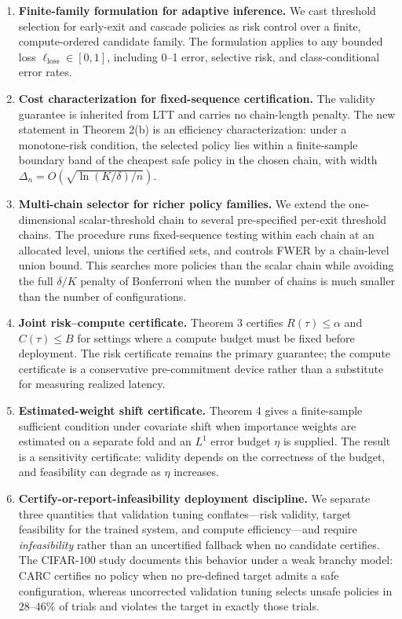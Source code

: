 \documentclass{ieeeaccess}
\begin{document}
\begin{enumerate}
\item \textbf{Finite-family formulation for adaptive inference.} We cast threshold selection for early-exit and cascade policies as risk control over a finite, compute-ordered candidate family. The formulation applies to any bounded loss $\ell_{\mathrm{loss}}\in[0,1]$, including 0--1 error, selective risk, and class-conditional error rates.
\item \textbf{Cost characterization for fixed-sequence certification.} The validity guarantee is inherited from LTT and carries no chain-length penalty. The new statement in Theorem 2(b) is an efficiency characterization: under a monotone-risk condition, the selected policy lies within a finite-sample boundary band of the cheapest safe policy in the chosen chain, with width $\Delta_n=O(\sqrt{\ln(K/\delta)/n})$.
\item \textbf{Multi-chain selector for richer policy families.} We extend the one-dimensional scalar-threshold chain to several pre-specified per-exit threshold chains. The procedure runs fixed-sequence testing within each chain at an allocated level, unions the certified sets, and controls FWER by a chain-level union bound. This searches more policies than the scalar chain while avoiding the full $\delta/K$ penalty of Bonferroni when the number of chains is much smaller than the number of configurations.
\item \textbf{Joint risk--compute certificate.} Theorem 3 certifies $R(\tau)\le\alpha$ and $C(\tau)\le B$ for settings where a compute budget must be fixed before deployment. The risk certificate remains the primary guarantee; the compute certificate is a conservative pre-commitment device rather than a substitute for measuring realized latency.
\item \textbf{Estimated-weight shift certificate.} Theorem 4 gives a finite-sample sufficient condition under covariate shift when importance weights are estimated on a separate fold and an $L^1$ error budget $\eta$ is supplied. The result is a sensitivity certificate: validity depends on the correctness of the budget, and feasibility can degrade as $\eta$ increases.
\item \textbf{Certify-or-report-infeasibility deployment discipline.} We separate three quantities that validation tuning conflates---risk validity, target feasibility for the trained system, and compute efficiency---and require \emph{infeasibility} rather than an uncertified fallback when no candidate certifies. The CIFAR-100 study documents this behavior under a weak branchy model: CARC certifies no policy when no pre-defined target admits a safe configuration, whereas uncorrected validation tuning selects unsafe policies in $28$--$46\%$ of trials and violates the target in exactly those trials.

\end{enumerate}
\end{document}
